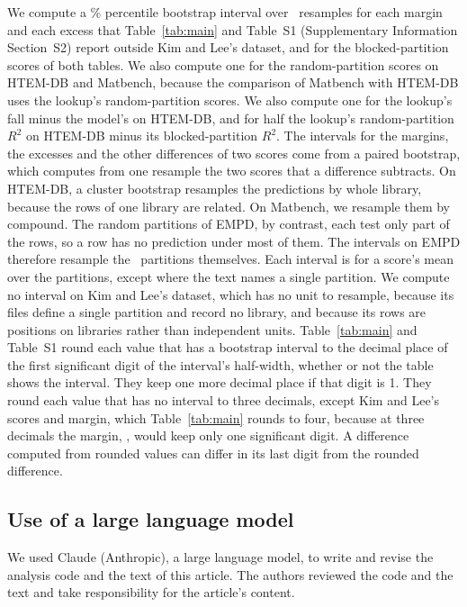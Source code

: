 \documentclass[11pt]{article}
\begin{document}
We compute a \bootstrapLevel\% percentile bootstrap
interval\cite{efron1993bootstrap} over \bootstrapReplicates\ resamples for each margin and each excess that Table~\ref{tab:main} and Table~S1 (Supplementary Information
Section~S2) report outside Kim and Lee's dataset, and for the blocked-partition scores of both
tables. We
also compute one for the random-partition scores on HTEM-DB and Matbench,
because the comparison of Matbench with HTEM-DB uses the lookup's
random-partition scores. We also compute one for the lookup's fall minus the
model's on HTEM-DB, and for half the lookup's random-partition $R^2$ on HTEM-DB
minus its blocked-partition $R^2$. The intervals for the margins, the excesses and the other differences of two
scores come from a paired bootstrap, which computes from one resample the two
scores that a difference subtracts. On HTEM-DB, a
cluster bootstrap resamples the predictions by whole library, because the rows
of one library are related. On Matbench, we resample them by compound.
The random partitions of EMPD, by contrast, each test only
part of the rows, so a row has no prediction under most of them. The intervals
on EMPD therefore resample the \splitDraws\ partitions
themselves. Each interval is for
a score's mean over the partitions, except where the text names a single
partition. We compute no interval on Kim and Lee's dataset, which has no unit to resample,
because its files
define a single partition and record no library, and because its rows are positions on
libraries rather than independent units. Table~\ref{tab:main} and Table~S1 round each value that has a bootstrap interval to the decimal place of
the first significant digit of the interval's half-width, whether or not the
table shows the interval. They keep one more decimal place if that digit
is 1. They
round each value that has no interval to three decimals, except Kim and Lee's
scores and margin, which Table~\ref{tab:main} rounds to four, because at three
decimals the margin, \npjMargin, would keep only one significant digit.
A difference computed from rounded values can differ in its last digit from
the rounded difference.

\subsection*{Use of a large language model}
\label{sec:llm}

We used Claude (Anthropic), a large language model, to write and revise the
analysis code and the text of this article. The authors reviewed the code and the
text and take responsibility for the article's content.
\end{document}
